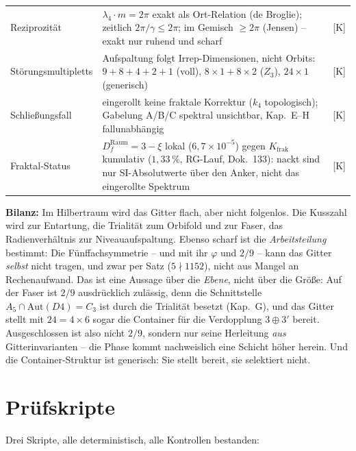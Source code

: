 {\begin{longtable}{lp{6.4cm}l}
Reziprozität & $\lambda_4\cdot m = 2\pi$ exakt als Ort-Relation
  (de Broglie); zeitlich $2\pi/\gamma \le 2\pi$; im Gemisch
  $\ge 2\pi$ (Jensen) -- exakt nur ruhend und scharf & [K] \\
Störungsmultipletts & Aufspaltung folgt Irrep-Dimensionen, nicht
  Orbits: $9{+}8{+}4{+}2{+}1$ (voll), $8{\times}1{+}8{\times}2$
  ($Z_3$), $24{\times}1$ (generisch) & [K] \\
Schließungsfall & eingerollt keine fraktale Korrektur
  ($k_4$ topologisch); Gabelung A/B/C spektral unsichtbar,
  Kap.~E--H fallunabhängig & [K] \\
Fraktal-Status & $D_f^\text{Raum} = 3-\xi$ lokal ($6{,}7{\times}10^{-5}$)
  gegen $K_\text{frak}$ kumulativ ($1{,}33\,\%$, RG-Lauf, Dok.~133):
  nackt sind nur SI-Absolutwerte über den Anker, nicht das
  eingerollte Spektrum & [K] \\
\end{longtable}
}

\medskip
\noindent\textbf{Bilanz:} Im Hilbertraum wird das Gitter flach, aber
nicht folgenlos. Die Kusszahl wird zur Entartung, die Trialität zum
Orbifold und zur Faser, das Radienverhältnis zur Niveauaufspaltung.
Ebenso scharf ist die \emph{Arbeitsteilung} bestimmt: Die
Fünffachsymmetrie -- und mit ihr $\varphi$ und $2/9$ -- kann das
Gitter \emph{selbst} nicht tragen, und zwar per Satz
($5 \nmid 1152$), nicht aus Mangel an Rechenaufwand. Das ist eine
Aussage über die \emph{Ebene}, nicht über die Größe: Auf der
Faser ist $2/9$ ausdrücklich zulässig, denn die Schnittstelle
$A_5 \cap \text{Aut}(D4) = C_3$ ist durch die Trialität besetzt
(Kap.~G), und das Gitter stellt mit $24 = 4\times6$ sogar die
Container für die Verdopplung $3\oplus3'$ bereit. Ausgeschlossen
ist also nicht $2/9$, sondern nur seine Herleitung \emph{aus}
Gitterinvarianten -- die Phase kommt nachweislich eine Schicht
höher herein. Und die Container-Struktur ist generisch: Sie stellt
bereit, sie selektiert nicht.

\chapter{Prüfskripte}

Drei Skripte, alle deterministisch, alle Kontrollen bestanden:

